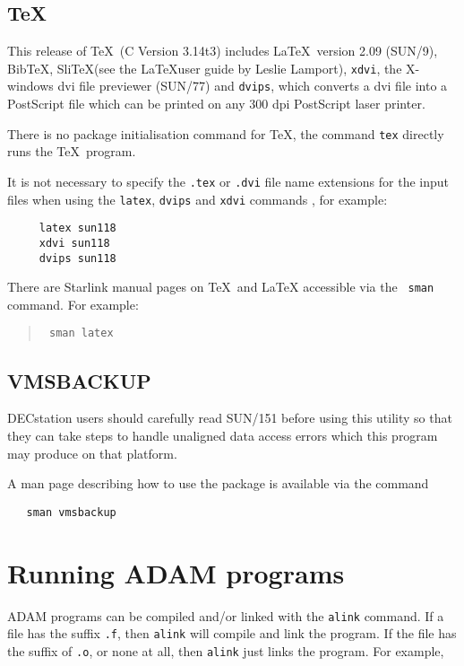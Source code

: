 \subsection{\TeX\ }

This release of \TeX\ (C Version 3.14t3) includes \LaTeX\ version 2.09 (SUN/9),
Bib\TeX, Sli\TeX (see the \LaTeX user guide by Leslie Lamport), {\tt xdvi}, the
X-windows dvi file previewer (SUN/77) and {\tt dvips}, which converts a dvi
file into a PostScript file which can be printed on any 300 dpi PostScript
laser printer.

There is no package initialisation command for \TeX, the command {\tt tex}
directly runs the \TeX\ program.

It is not necessary to specify the {\tt .tex} or {\tt .dvi} file name
extensions for the input files when using the {\tt latex}, {\tt dvips} and
{\tt xdvi} commands , for example:

\begin{verbatim}
     latex sun118
     xdvi sun118
     dvips sun118
\end{verbatim}

There are Starlink manual pages on \TeX\ and {\LaTeX}  accessible via the {\tt
sman} command. For example:
\begin{quote}\tt
sman latex
\end{quote}


\subsection{VMSBACKUP}

DECstation users should carefully read SUN/151 before using this
utility so that they can take steps to handle unaligned data access errors
which this program may produce on that platform.

A man page describing how to use the package is available via the command
\begin{verbatim}
   sman vmsbackup
\end{verbatim}

\section{Running ADAM programs}

ADAM programs can be compiled and/or linked with the {\tt alink} command. If
a file has the suffix  {\tt .f}, then {\tt alink} will compile
and link the program. If the file has the suffix of {\tt .o}, or
none at all, then {\tt alink} just links the program. For example,

